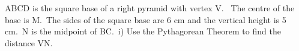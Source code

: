 \documentclass[preview]{standalone}
\begin{document}
\begin{center}
\begin{minipage}{12cm}
\raggedright ABCD is the square base of a right pyramid with vertex V. \
 The centre of the base is M.\
 The sides of the square base are 6 cm and the vertical height is 5 cm.\
 N is the midpoint of BC.\
 i) Use the Pythagorean Theorem to find the distance VN.
\end{minipage}
\end{center}
\end{document}
